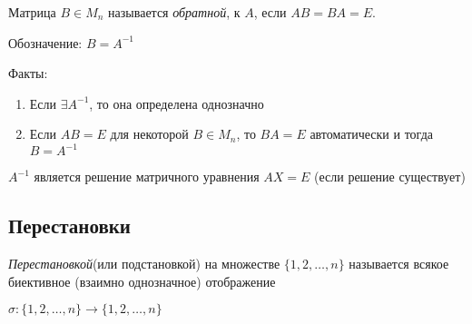 \begin{definition}
    Матрица $B \in M_n$ называется \textit{обратной}, к $A$, если $AB = BA = E$.
    
    Обозначение: $B = A^{-1}$
\end{definition}


Факты:
\begin{enumerate}
\item Если $\exists A^{-1}$, то она определена однозначно
\item Если $AB = E$ для некоторой $B \in M_n$, то $BA = E$ автоматически и тогда $B = A^{-1}$
\end{enumerate}

\begin{consequence}
    $A^{-1}$ является решение матричного уравнения $AX = E$ (если решение существует)
\end{consequence}

\subsection{Перестановки}

\begin{definition}
    \textit{Перестановкой}(или подстановкой) на множестве $\{1, 2, \dots, n\}$ называется всякое биективное (взаимно однозначное) отображение  

    $\sigma : \{1, 2, \dots, n\} \to \{1, 2, \dots, n\}$
\end{definition}
